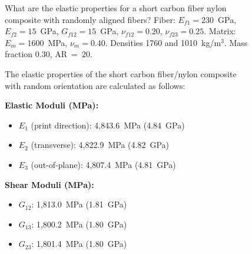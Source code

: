 \documentclass[preprint,review,10pt,number]{elsarticle}
\begin{document}
\begin{figure}[h]
\begin{tcolorbox}[
    colback=gray!5,
    colframe=black,
    boxrule=0.6pt,
    arc=2pt,
    left=8pt, right=8pt, top=6pt, bottom=6pt,
    title={\textbf{Prompt E6} \hfill \textit{Orientation keyword resolution}},
    fonttitle=\small
]
\begin{tcolorbox}[
    colback=gray!8,
    colframe=gray!60,
    boxrule=0.5pt,
    arc=2pt,
    left=6pt, right=6pt, top=4pt, bottom=4pt,
    title={\textbf{User}},
    fonttitle=\small\bfseries,
    coltitle=black
]
\small
What are the elastic properties for a short carbon fiber nylon 
composite with randomly aligned fibers? Fiber: $E_{f1} = 230$~GPa, 
$E_{f2} = 15$~GPa, $G_{f12} = 15$~GPa, $\nu_{f12} = 0.20$, 
$\nu_{f23} = 0.25$. Matrix: $E_m = 1600$~MPa, $\nu_m = 0.40$. 
Densities 1760 and 1010~kg/m$^3$. Mass fraction 0.30, AR~=~20.
\end{tcolorbox}
\vspace{6pt}
\begin{tcolorbox}[
    colback=gray!3,
    colframe=gray!40,
    boxrule=0.5pt,
    arc=2pt,
    left=6pt, right=6pt, top=4pt, bottom=4pt,
    title={\textbf{\texttt{MateriAl}}},
    fonttitle=\small\bfseries,
    coltitle=black
]
\small
The elastic properties of the short carbon fiber/nylon composite 
with random orientation are calculated as follows:
\vspace{4pt}

\textbf{Elastic Moduli (MPa):}
\begin{itemize}[leftmargin=1.2em, itemsep=0pt, topsep=2pt]
\item $E_1$ (print direction): 4{,}843.6~MPa (4.84~GPa)
\item $E_2$ (transverse): 4{,}822.9~MPa (4.82~GPa)
\item $E_3$ (out-of-plane): 4{,}807.4~MPa (4.81~GPa)
\end{itemize}

\textbf{Shear Moduli (MPa):}
\begin{itemize}[leftmargin=1.2em, itemsep=0pt, topsep=2pt]
\item $G_{12}$: 1{,}813.0~MPa (1.81~GPa)
\item $G_{13}$: 1{,}800.2~MPa (1.80~GPa)
\item $G_{23}$: 1{,}801.4~MPa (1.80~GPa)
\end{itemize}


\end{tcolorbox}
\end{tcolorbox}
\end{figure}
\end{document}
